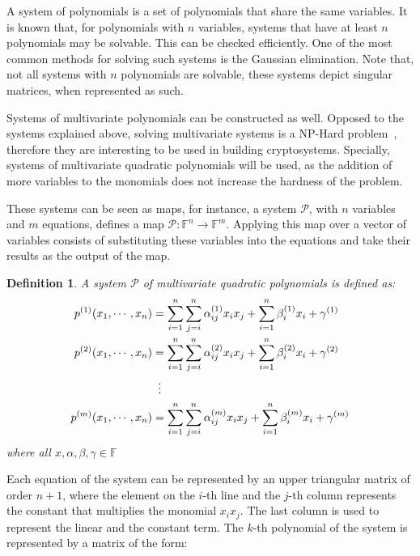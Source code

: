\documentclass{ufsctex/ufsctex}
\newtheorem{definition}{Definition}
\begin{document}
A system of polynomials is a set of polynomials that share the same variables.
It is known that, for polynomials with $n$ variables, systems that have at
least $n$ polynomials may be solvable. This can be checked efficiently. One of
the most common methods for solving such systems is the Gaussian elimination.
Note that, not all systems with $n$ polynomials are solvable, these systems
depict singular matrices, when represented as such.


Systems of multivariate polynomials can be constructed as well. Opposed to the
systems explained above, solving multivariate systems is a NP-Hard
problem~\cite{garey1979npc}, therefore they are interesting to be used in
building cryptosystems. Specially, systems of multivariate quadratic
polynomials will be used, as the addition of more variables to the monomials
does not increase the hardness of the problem. %

These systems can be seen as maps, for instance, a system $\mathcal{P}$, with
$n$ variables and $m$ equations, defines a map $\mathcal{P}:\mathbb{F}^n \to
\mathbb{F}^m$. Applying this map over a vector of variables consists of
substituting these variables into the equations and take their results as the
output of the map.

\begin{definition}\label{def:mqsystem}
A system $\mathcal{P}$ of multivariate quadratic polynomials is defined as:
\begin{equation}\label{eq:mqsystem}
\begin{split}
p^{(1)}(x_1,\cdots,x_n) &= \sum_{i=1}^n \sum_{j=i}^n \alpha^{(1)}_{ij} x_i x_j
	+ \sum_{i=1}^n \beta^{(1)}_i x_i + \gamma^{(1)} \\
p^{(2)}(x_1,\cdots,x_n) &= \sum_{i=1}^n \sum_{j=i}^n \alpha^{(2)}_{ij} x_i x_j
	+ \sum_{i=1}^n \beta^{(2)}_i x_i + \gamma^{(2)} \\
&\vdotswithin{=} \\
p^{(m)}(x_1,\cdots,x_n) &= \sum_{i=1}^n \sum_{j=i}^n \alpha^{(m)}_{ij} x_i x_j
	+ \sum_{i=1}^n \beta^{(m)}_i x_i + \gamma^{(m)}
\end{split}
\end{equation}
where all $x, \alpha, \beta, \gamma \in \mathbb{F}$
\end{definition}

Each equation of the system can be represented by an upper triangular matrix of
order $n+1$, where the element on the $i$-th line and the $j$-th column
represents the constant that multiplies the monomial $x_i x_j$. The last column
is used to represent the linear and the constant term. The $k$-th polynomial of
the system is represented by a matrix of the form:
\end{document}
